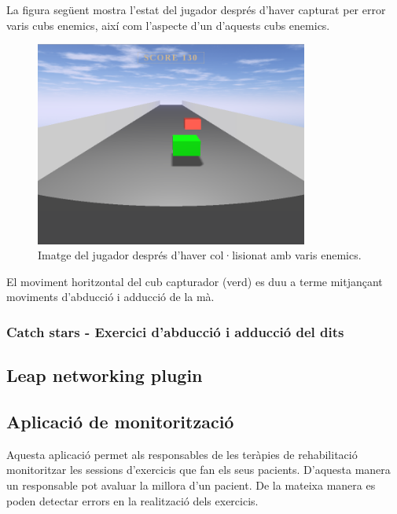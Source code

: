\documentclass[12pt,a4paper,catalan]{article}
\begin{document}
	La figura següent mostra l'estat del jugador després d'haver capturat per error varis cubs enemics, així com l'aspecte d'un d'aquests cubs enemics.
	\begin{figure}[H]
		\includegraphics[width=0.8\textwidth,keepaspectratio]{cubes-road-enemy.png}
		\centering
		\caption{Imatge del jugador després d'haver col·lisionat amb varis enemics.}
		\label{fig:cubes-road-enemy}
	\end{figure}
	El moviment horitzontal del cub capturador (verd) es duu a terme mitjançant moviments d'abducció i adducció de la mà.
	\subsubsection{Catch stars - Exercici d'abducció i adducció del dits}
	\subsection{Leap networking plugin}
	\subsection{Aplicació de monitorització}
	Aquesta aplicació permet als responsables de les teràpies de rehabilitació monitoritzar les sessions d'exercicis que fan els seus pacients. D'aquesta manera un responsable pot avaluar la millora d'un pacient. De la mateixa manera es poden detectar errors en la realització dels exercicis.
	
\end{document}
